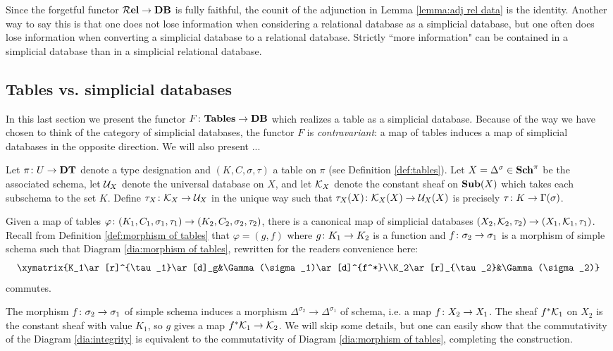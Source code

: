 \documentclass{amsart}
\def\DT{{\bf DT}}
\def\Sch{{\bf Sch}}
\def\Tables{{\bf Tables}}
\def\mcRel{{\bf \mcR el}}
\def\Sub{{\bf Sub}}
\def\Data{{\bf DB}}
\begin{document}
Since the forgetful functor $\mcRel\to\Data$ is fully faithful, the counit of the adjunction in Lemma \ref{lemma:adj rel data} is the identity.  Another way to say this is that one does not lose information when considering a relational database as a simplicial database, but one often does lose information when converting a simplicial database to a relational database.  Strictly ``more information" can be contained in a simplicial database than in a simplicial relational database.

\subsection{Tables vs. simplicial databases}

In this last section we present the functor $F\taking\Tables\to\Data$ which realizes a table as a simplicial database.  Because of the way we have chosen to think of the category of simplicial databases, the functor $F$ is {\em contravariant}: a map of tables induces a map of simplicial databases in the opposite direction.  We will also present ...

\begin{construction}\label{con:table as database}

Let $\pi\taking U\to\DT$ denote a type designation and $(K,C,\sigma,\tau)$ a table on $\pi$ (see Definition \ref{def:tables}).  Let $X=\Delta^\sigma\in\Sch^\pi$ be the associated schema, let $\mathcal{U}_X$ denote the universal database on $X$, and let $\mathcal{K}_X$ denote the constant sheaf on $\Sub(X)$ which takes each subschema to the set $K$.  Define $\tau_X\colon\mathcal{K}_X\rightarrow\mathcal{U}_X$ in the unique way such that $\tau_X(X)\colon\mathcal{K}_X(X)\rightarrow\mathcal{U}_X(X)$ is precisely $\tau\colon K\rightarrow\Gamma(\sigma)$. 

Given a map of tables $\varphi\colon(K_1,C_1,\sigma_1,\tau_1)\rightarrow(K_2,C_2,\sigma_2,\tau_2)$, there is a canonical map of simplicial databases $(X_2,\mathcal{K}_2,\tau_2)\rightarrow(X_1,\mathcal{K}_1,\tau_1)$.  Recall from Definition \ref{def:morphism of tables} that $\varphi=(g,f)$ where $g\colon K_1\rightarrow K_2$ is a function and $f\colon\sigma_2\rightarrow\sigma_1$ is a morphism of simple schema such that Diagram \ref{dia:morphism of tables}, rewritten for the readers convenience here: $$\xymatrix{K_1\ar[r]^{\tau_1}\ar[d]_g&\Gamma(\sigma_1)\ar[d]^{f^*}\\K_2\ar[r]_{\tau_2}&\Gamma(\sigma_2)}$$ commutes.

The morphism $f\colon\sigma_2\rightarrow\sigma_1$ of simple schema induces a morphism $\Delta^{\sigma_2}\to\Delta^{\sigma_1}$ of schema, i.e. a map $f\colon X_2\rightarrow X_1$.  The sheaf $f^*\mathcal{K}_1$ on $X_2$ is the constant sheaf with value $K_1$, so $g$ gives a map $f^*\mathcal{K}_1\rightarrow\mathcal{K}_2$.  We will skip some details, but one can easily show that the commutativity of the Diagram \ref{dia:integrity} is equivalent to the commutativity of Diagram \ref{dia:morphism of tables}, completing the construction.

\end{construction}
\end{document}
